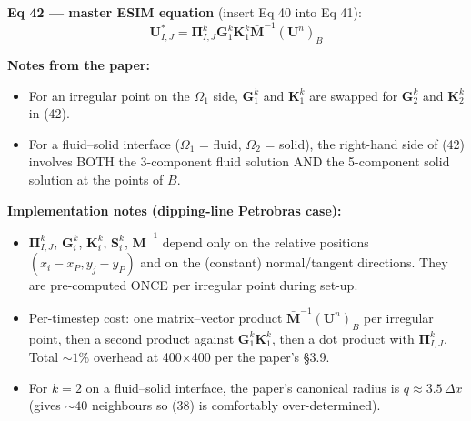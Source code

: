 \medskip

\textbf{Eq 42 --- master ESIM equation} (insert Eq 40 into Eq 41):
\begin{equation*}
  \boxed{\ \boldsymbol{U}^*_{I,J}
  = \boldsymbol{\Pi}_{I,J}^k \boldsymbol{G}_1^k \boldsymbol{K}_1^k
    \bar{\boldsymbol{M}}^{-1} (\boldsymbol{U}^n)_B\ }
  \tag{42}
\end{equation*}

\medskip

\textbf{Notes from the paper:}
\begin{itemize}
  \item For an irregular point on the $\Omega_1$ side,
    $\boldsymbol{G}_1^k$ and $\boldsymbol{K}_1^k$ are swapped for
    $\boldsymbol{G}_2^k$ and $\boldsymbol{K}_2^k$ in (42).
  \item For a fluid--solid interface ($\Omega_1$ = fluid,
    $\Omega_2$ = solid), the right-hand side of (42) involves
    BOTH the 3-component fluid solution AND the 5-component
    solid solution at the points of $B$.
\end{itemize}

\medskip

\textbf{Implementation notes (dipping-line Petrobras case):}
\begin{itemize}
  \item $\boldsymbol{\Pi}_{I,J}^k$, $\boldsymbol{G}_i^k$,
    $\boldsymbol{K}_i^k$, $\boldsymbol{S}_i^k$,
    $\bar{\boldsymbol{M}}^{-1}$ depend only on the relative
    positions $(x_i - x_P, y_j - y_P)$ and on the (constant)
    normal/tangent directions. They are pre-computed ONCE per
    irregular point during set-up.
  \item Per-timestep cost: one matrix--vector product
    $\bar{\boldsymbol{M}}^{-1} (\boldsymbol{U}^n)_B$ per
    irregular point, then a second product against
    $\boldsymbol{G}_1^k \boldsymbol{K}_1^k$, then a dot product
    with $\boldsymbol{\Pi}_{I,J}^k$. Total $\sim 1\%$ overhead at
    400$\times$400 per the paper's §3.9.
  \item For $k = 2$ on a fluid--solid interface, the paper's
    canonical radius is $q \approx 3.5\,\Delta x$ (gives
    $\sim 40$ neighbours so (38) is comfortably
    over-determined).
\end{itemize}
